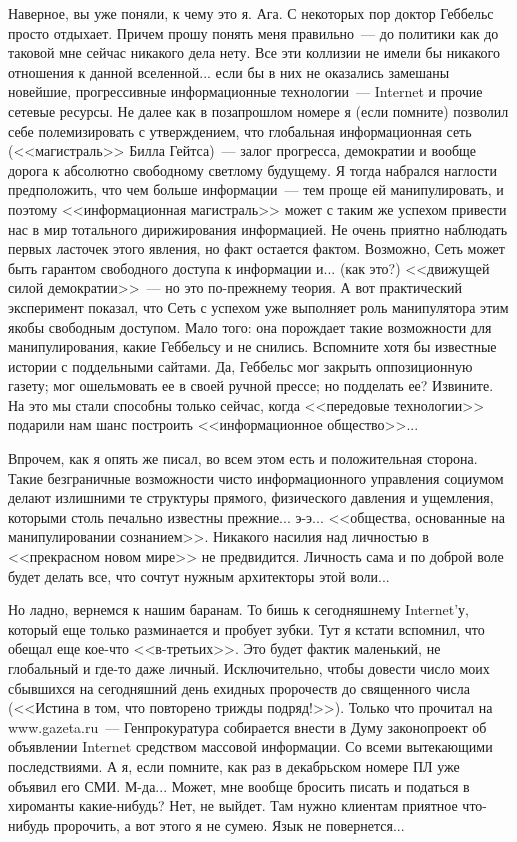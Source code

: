\documentclass{scrbook}
\newcommand{\flqq}{<<}
\newcommand{\frqq}{>>}
\newcommand{\mdash}{~--- }
\begin{document}
Наверное, вы уже поняли, к чему это я. Ага. С некоторых пор доктор Геббельс просто отдыхает. Причем прошу понять меня правильно{\mdash}до политики как до таковой мне сейчас никакого дела нету. Все эти коллизии не имели бы никакого отношения к данной вселенной... если бы в них не оказались замешаны новейшие, прогрессивные информационные технологии{\mdash}Internet и прочие сетевые ресурсы. Не далее как в позапрошлом номере я (если помните) позволил себе полемизировать с утверждением, что глобальная информационная сеть ({\flqq}магистраль{\frqq} Билла Гейтса){\mdash}залог прогресса, демократии и вообще дорога к абсолютно свободному светлому будущему. Я тогда набрался наглости предположить, что чем больше информации{\mdash}тем проще ей манипулировать, и поэтому {\flqq}информационная магистраль{\frqq} может с таким же успехом привести нас в мир тотального дирижирования информацией. Не очень приятно наблюдать первых ласточек этого явления, но факт остается фактом. Возможно, Сеть может быть гарантом свободного доступа к информации и... (как это?) {\flqq}движущей силой демократии{\frqq}{\mdash}но это по-прежнему теория. А вот практический эксперимент показал, что Сеть с успехом уже выполняет роль манипулятора этим якобы свободным доступом. Мало того: она порождает такие возможности для манипулирования, какие Геббельсу и не снились. Вспомните хотя бы известные истории с поддельными сайтами. Да, Геббельс мог закрыть оппозиционную газету; мог ошельмовать ее в своей ручной прессе; но подделать ее? Извините. На это мы стали способны только сейчас, когда {\flqq}передовые технологии{\frqq} подарили нам шанс построить {\flqq}информационное общество{\frqq}...

Впрочем, как я опять же писал, во всем этом есть и положительная сторона. Такие безграничные возможности чисто информационного управления социумом делают излишними те структуры прямого, физического давления и ущемления, которыми столь печально известны прежние... э-э... {\flqq}общества, основанные на манипулировании сознанием{\frqq}. Никакого насилия над личностью в {\flqq}прекрасном новом мире{\frqq} не предвидится. Личность сама и по доброй воле будет делать все, что сочтут нужным архитекторы этой воли...

Но ладно, вернемся к нашим баранам. То бишь к сегодняшнему Internet'у, который еще только разминается и пробует зубки. Тут я кстати вспомнил, что обещал еще кое-что {\flqq}в-третьих{\frqq}. Это будет фактик маленький, не глобальный и где-то даже личный. Исключительно, чтобы довести число моих сбывшихся на сегодняшний день ехидных пророчеств до священного числа ({\flqq}Истина в том, что повторено трижды подряд!{\frqq}). Только что прочитал на www.gazeta.ru{\mdash}Генпрокуратура собирается внести в Думу законопроект об объявлении Internet средством массовой информации. Со всеми вытекающими последствиями. А я, если помните, как раз в декабрьском номере ПЛ уже объявил его СМИ. М-да... Может, мне вообще бросить писать и податься в хироманты какие-нибудь? Нет, не выйдет. Там нужно клиентам приятное что-нибудь пророчить, а вот этого я не сумею. Язык не повернется...
\end{document}
